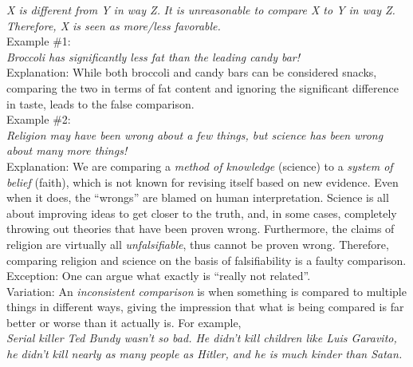 \documentclass[a4paper,12pt,single,pdftex]{scrbook}
\begin{document}
    
      {\em X is different from Y in way Z.} \newline
{\em It is unreasonable to compare X to Y in way Z.} \newline
{\em Therefore, X is seen as more/less favorable.}
    \\

    
      Example \#1:
    \\

    
      {\em Broccoli has significantly less fat than the leading candy bar!}
    \\

    
      Explanation: While both broccoli and candy bars can be considered snacks, comparing the two in terms of fat content and ignoring the significant difference in taste, leads to the false comparison.
    \\

    
      Example \#2:
    \\

    
      {\em Religion may have been wrong about a few things, but science has been wrong about many more things!}
    \\

    
      Explanation: We are comparing a {\it method of knowledge}  (science) to a {\it system of belief} (faith), which is not known for revising itself based on new evidence.  Even when it does, the “wrongs” are blamed on human interpretation.  Science is all about improving ideas to get closer to the truth, and, in some cases, completely throwing out theories that have been proven wrong.  Furthermore, the claims of religion are virtually all {\it unfalsifiable}, thus cannot be proven wrong.  Therefore, comparing religion and science on the basis of falsifiability is a faulty comparison.
    \\

    
      Exception: One can argue what exactly is “really not related”.
    \\

    
      Variation: An {\em inconsistent comparison} is when something is compared to multiple things in different ways, giving the impression that what is being compared is far better or worse than it actually is. For example,
    \\

    
      {\em Serial killer Ted Bundy wasn’t so bad. He didn’t kill children like Luis Garavito, he didn’t kill nearly as many people as Hitler, and he is much kinder than Satan.}
    \\
\end{document}
